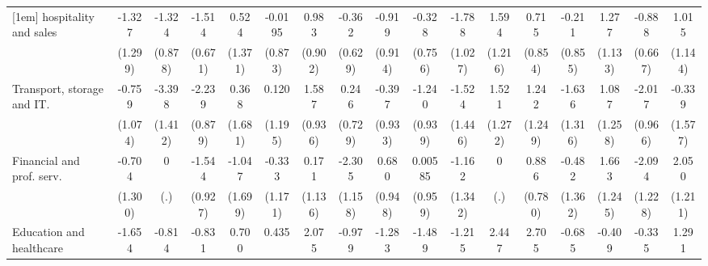 {\begin{tabular}{l*{16}{c}}
[1em]
hospitality and sales&      -1.327         &      -1.324         &      -1.514\sym{*}  &       0.524         &     -0.0195         &       0.983         &      -0.362         &      -0.919         &      -0.328         &      -1.788         &       1.594         &       0.715         &      -0.211         &       1.277         &      -0.888         &       1.015         \\
                    &     (1.299)         &     (0.878)         &     (0.671)         &     (1.371)         &     (0.873)         &     (0.902)         &     (0.629)         &     (0.914)         &     (0.756)         &     (1.027)         &     (1.216)         &     (0.854)         &     (0.855)         &     (1.133)         &     (0.667)         &     (1.144)         \\
[1em]
Transport, storage and IT.&      -0.759         &      -3.398\sym{*}  &      -2.239\sym{*}  &       0.368         &       0.120         &       1.587         &       0.246         &      -0.397         &      -1.240         &      -1.524         &       1.521         &       1.242         &      -1.636         &       1.087         &      -2.017\sym{*}  &      -0.339         \\
                    &     (1.074)         &     (1.412)         &     (0.879)         &     (1.681)         &     (1.195)         &     (0.936)         &     (0.729)         &     (0.933)         &     (0.939)         &     (1.446)         &     (1.272)         &     (1.249)         &     (1.316)         &     (1.258)         &     (0.966)         &     (1.577)         \\
[1em]
Financial and prof. serv.&      -0.704         &           0         &      -1.544         &      -1.047         &      -0.333         &       0.171         &      -2.305\sym{*}  &       0.680         &     0.00585         &      -1.162         &           0         &       0.886         &      -0.482         &       1.663         &      -2.094         &       2.050         \\
                    &     (1.300)         &         (.)         &     (0.927)         &     (1.699)         &     (1.171)         &     (1.136)         &     (1.158)         &     (0.948)         &     (0.959)         &     (1.342)         &         (.)         &     (0.780)         &     (1.362)         &     (1.245)         &     (1.228)         &     (1.211)         \\
[1em]
Education and healthcare&      -1.654         &      -0.814         &      -0.831         &       0.700         &       0.435         &       2.075\sym{*}  &      -0.979         &      -1.283         &      -1.489         &      -1.215         &       2.447         &       2.705\sym{*}  &      -0.685         &      -0.409         &      -0.335         &       1.291         \\

\end{tabular}}
